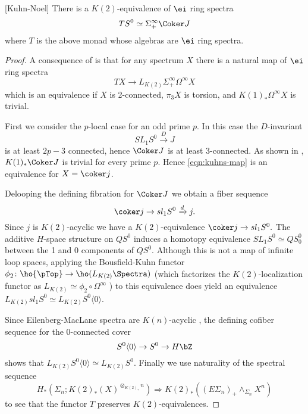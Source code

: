 \documentclass[leqno,oneside,english]{elsarticle}
\begin{document}
\begin{thm}{[Kuhn-Noel]}
  \label{thm:suspension-spectrum-coker-j-is-K2-locally-free}
  There is a $K(2)$-equivalence of $\ei$ ring spectra \[T
  S^0\simeq \Sigma^{\infty}_+ \Coker J\] where $T$ is the above monad whose
  algebras are $\ei$ ring spectra.
\end{thm}
\begin{proof}
  A consequence of \cite[Thm.~2.21]{Kuh06a} is that for any
  spectrum $X$  there is a natural map of $\ei$ ring spectra
  \begin{equation} \label{eqn:kuhns-map}
    T X \rightarrow L_{K(2)} \Sigma^{\infty}_{+} \Omega^{\infty} X 
  \end{equation} 
  which is an equivalence if $X$ is 2-connected, $\pi_3 X$ is torsion, and $K(1)_*\Omega^{\infty} X$ is trivial.
  
  First we consider the $p$-local case for an odd prime $p$. In this
  case the $D$-invariant \[
  SL_1 S^{0}\xrightarrow{D} J \]
  is at least $2p-3$ connected, hence $\Coker J$ is at least
  $3$-connected.   {{\ifshowsaveblocks
{}
\fi}}{}  As shown in \cite[Thm.~2.7]{HoS78}, $K(1)_*\Coker J$ is trivial for every prime $p$. Hence
  \eqref{eqn:kuhns-map} is an equivalence for $X=\coker j$.

  Delooping the defining fibration for $\Coker J$ we obtain a fiber sequence
  \[
   \coker j \rightarrow sl_{1}S^0 \xrightarrow{d} j.
  \]
  Since $j$ is $K(2)$-acyclic we have a $K(2)$-equivalence $\coker
  j\rightarrow sl_{1}S^0.$  The additive $H$-space structure on $QS^0$ induces a homotopy equivalence $SL_1
  S^0\simeq QS^0_{0}$ between the 1 and 0 components of $QS^0$. Although
  this is not a map of infinite loop spaces, applying the Bousfield-Kuhn
  functor $\phi_2\colon \ho{\pTop}\rightarrow \ho(L_{K(2)}\Spectra)$ (which factorizes the $K(2)$-localization functor as $L_{K(2)}\simeq \phi_2\circ \Omega^{\infty}$ \cite[Thm.~1.1]{Kuh84}) to this equivalence does yield an equivalence
  $L_{K(2)} sl_1 S^0\simeq L_{K(2)} S^0\langle 0\rangle$. 

  Since Eilenberg-MacLane spectra are
  $K(n)$-acyclic \cite{RaW80}, the defining cofiber sequence for
  the 0-connected cover
  \[
    S^0\langle 0 \rangle \rightarrow S^0 \rightarrow H\bZ
  \]
  shows that $L_{K(2)}S^0 \langle 0\rangle \simeq L_{K(2)} S^0.$  
  Finally we use naturality of the spectral sequence 
  \[ H_*(\Sigma_n; K(2)_{*}(X)^{\otimes_{K(2)_*} n}) \Longrightarrow K(2)_{*}
   ((E\Sigma_n)_{+} \wedge_{\Sigma_{n}} X^{n})\]
  to see that the functor $T$ preserves
  $K(2)$-equivalences. 
  

\end{proof}
\end{document}
